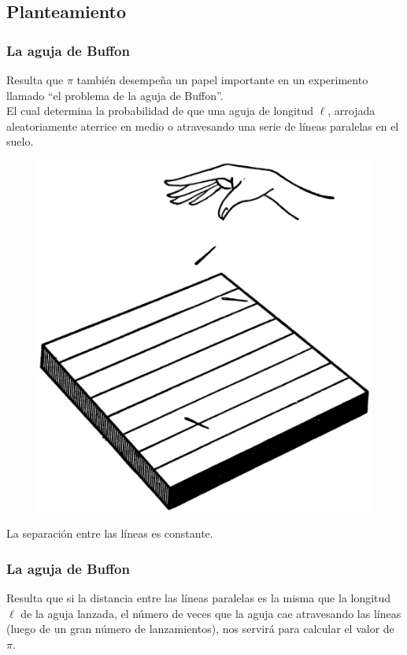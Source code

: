 \subsection{Planteamiento}
\begin{frame}
\frametitle{La aguja de Buffon}
Resulta que $\pi$ también desempeña un papel importante en un experimento llamado \enquote{el problema de la aguja de Buffon}.
\\
\bigskip
\pause
El cual determina la probabilidad de que una aguja de longitud $\ell$, arrojada aleatoriamente aterrice en medio o atravesando una serie de líneas paralelas en el suelo.
\end{frame}
\begin{frame}
\begin{figure}
	\centering
	\includegraphics[scale=0.10]{Imagenes/aguja-de-buffon.eps}
\end{figure}
La separación entre las líneas es constante.
\end{frame}
\begin{frame}
\frametitle{La aguja de Buffon}
Resulta que si la distancia entre las líneas paralelas es la misma que la longitud $\ell$ de la aguja lanzada, el número de veces que la aguja cae atravesando las líneas (luego de un gran número de lanzamientos), nos servirá para calcular el valor de $\pi$.
\end{frame}
